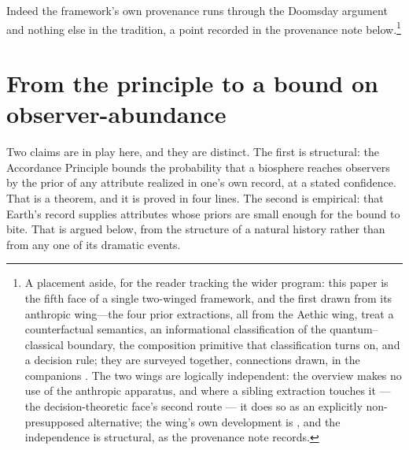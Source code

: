 Indeed the framework's own provenance runs through the Doomsday argument and nothing else in the tradition, a point recorded in the provenance note below.\footnote{A placement aside, for the reader tracking the wider program: this paper is the fifth face of a single two-winged framework, and the first drawn from its anthropic wing---the four prior extractions, all from the Aethic wing, treat a counterfactual semantics, an informational classification of the quantum--classical boundary, the composition primitive that classification turns on, and a decision rule; they are surveyed together, connections drawn, in the companions \cite{Aethus, AethusBrief}. The two wings are logically independent: the overview \cite{AethusBrief} makes no use of the anthropic apparatus, and where a sibling extraction touches it --- the decision-theoretic face's second route --- it does so as an explicitly non-presupposed alternative; the wing's own development is \cite{Nexus}, and the independence is structural, as the provenance note records.}

\section{From the principle to a bound on observer-abundance}
\label{sec:rarity-bound}

Two claims are in play here, and they are distinct. The first is structural: the Accordance Principle bounds the probability that a biosphere reaches observers by the prior of any attribute realized in one's own record, at a stated confidence. That is a theorem, and it is proved in four lines. The second is empirical: that Earth's record supplies attributes whose priors are small enough for the bound to bite. That is argued below, from the structure of a natural history rather than from any one of its dramatic events.

